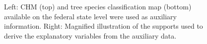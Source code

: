 \begin{figure}[H]
	\centering
	\caption{Left: CHM (top) and tree species classification map (bottom) available on the federal state level were used as auxiliary information. Right: Magnified illustration of the supports used to derive the explanatory variables from the auxiliary data.}
	\label{fig:Auxvars}
\end{figure}


